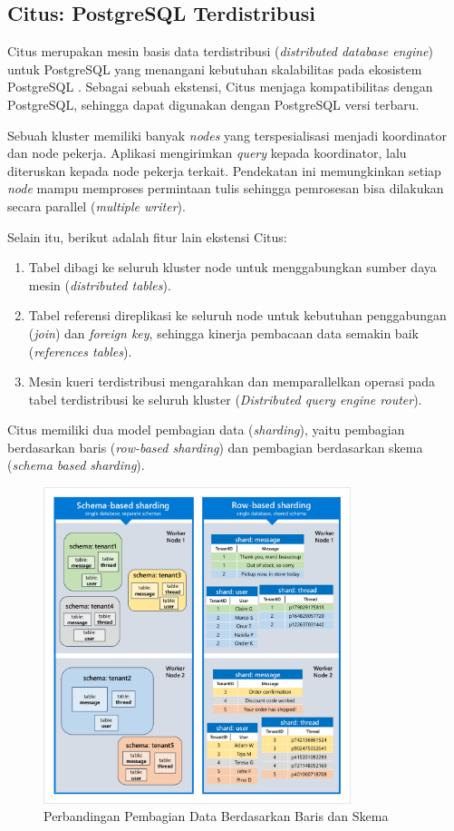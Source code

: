 \subsection{Citus: PostgreSQL Terdistribusi}

Citus merupakan mesin basis data terdistribusi (\textit{distributed database engine}) untuk PostgreSQL yang menangani kebutuhan skalabilitas pada ekosistem PostgreSQL \parencite{citus}. Sebagai sebuah ekstensi, Citus menjaga kompatibilitas dengan PostgreSQL, sehingga dapat digunakan dengan PostgreSQL versi terbaru.

Sebuah kluster memiliki banyak \textit{nodes} yang terspesialisasi menjadi koordinator dan node pekerja. Aplikasi mengirimkan \textit{query} kepada koordinator, lalu diteruskan kepada node pekerja terkait. Pendekatan ini memungkinkan setiap \textit{node} mampu memproses permintaan tulis sehingga pemrosesan bisa dilakukan secara parallel (\textit{multiple writer}).

Selain itu, berikut adalah fitur lain ekstensi Citus:

\begin{enumerate}
    \item Tabel dibagi ke seluruh kluster node untuk menggabungkan sumber daya mesin (\textit{distributed tables}).
    \item Tabel referensi direplikasi ke seluruh node untuk kebutuhan penggabungan (\textit{join}) dan \textit{foreign key}, sehingga kinerja pembacaan data semakin baik (\textit{references tables}).
    \item Mesin kueri terdistribusi mengarahkan dan memparallelkan operasi pada tabel terdistribusi ke seluruh kluster (\textit{Distributed query engine router}).
\end{enumerate}

Citus memiliki dua model pembagian data (\textit{sharding}), yaitu pembagian berdasarkan baris (\textit{row-based sharding}) dan pembagian berdasarkan skema (\textit{schema based sharding}).

\begin{figure}[ht]
    \centering
    \includegraphics[width=0.8\textwidth]{resources/chapter-2/row-vs-schema-sharding.png}
    \caption{Perbandingan Pembagian Data Berdasarkan Baris dan Skema \parencite{schemaBasedSharding}}
    \label{fig:row-vs-schema-sharding}
\end{figure}

